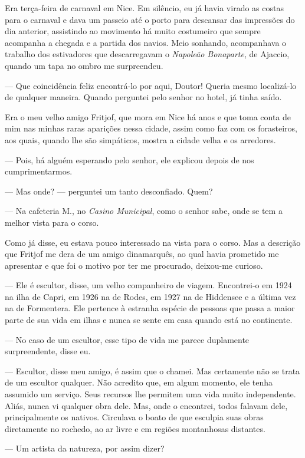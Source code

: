 Era terça-feira de carnaval em Nice. Em silêncio, eu já havia virado as
costas para o carnaval e dava um passeio até o porto para descansar das
impressões do dia anterior, assistindo ao movimento há muito costumeiro
que sempre acompanha a chegada e a partida dos navios. Meio sonhando,
acompanhava o trabalho dos estivadores que descarregavam o
\emph{Napoleão Bonaparte}, de Ajaccio, quando um tapa no ombro me
surpreendeu.

--- Que coincidência feliz encontrá-lo por aqui, Doutor! Queria mesmo
localizá-lo de qualquer maneira. Quando perguntei pelo senhor no hotel,
já tinha saído.

Era o meu velho amigo Fritjof, que mora em Nice há anos e que toma conta
de mim nas minhas raras aparições nessa cidade, assim como faz com os
forasteiros, aos quais, quando lhe são simpáticos, mostra a cidade velha
e os arredores.

--- Pois, há alguém esperando pelo senhor, ele explicou depois de nos
cumprimentarmos.

--- Mas onde? --- perguntei um tanto desconfiado. Quem?

--- Na cafeteria M., no \emph{Casino Municipal}, como o senhor sabe, onde
se tem a melhor vista para o corso.

Como já disse, eu estava pouco interessado na vista para o corso. Mas a
descrição que Fritjof me dera de um amigo dinamarquês, ao qual havia
prometido me apresentar e que foi o motivo por ter me procurado,
deixou-me curioso.

--- Ele é escultor, disse, um velho companheiro de viagem. Encontrei-o em
1924 na ilha de Capri, em 1926 na de Rodes, em 1927 na de Hiddensee e a
última vez na de Formentera. Ele pertence à estranha espécie de pessoas
que passa a maior parte de sua vida em ilhas e nunca se sente em casa
quando está no continente.

--- No caso de um escultor, esse tipo de vida me parece duplamente
surpreendente, disse eu.

--- Escultor, disse meu amigo, é assim que o chamei. Mas certamente não
se trata de um escultor qualquer. Não acredito que, em algum momento,
ele tenha assumido um serviço. Seus recursos lhe permitem uma vida muito
independente. Aliás, nunca vi qualquer obra dele. Mas, onde o encontrei,
todos falavam dele, principalmente os nativos. Circulava o boato de que
esculpia suas obras diretamente no rochedo, ao ar livre e em regiões
montanhosas distantes.

--- Um artista da natureza, por assim dizer?

